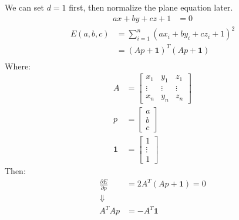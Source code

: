 \documentclass[conference,onecolumn]{IEEEtran}
\begin{document}
\begin{enumerate}[label=\arabic{enumi}.]
\begin{enumerate}
                        We can set $d = 1$ first, then normalize the plane equation later.
                        \begin{align*}
                              ax + by + cz + 1 & = 0
                        \end{align*}
                        \begin{align*}
                              E(a, b, c) & = \sum_{i = 1}^{n} (ax_i + by_i + cz_i + 1)^2 \\
                                         & = (Ap + \mathbf{1})^T(Ap + \mathbf{1})        \\
                        \end{align*}
                        Where:
                        \begin{align*}
                              A          & = \begin{bmatrix}
                                    x_1    & y_1    & z_1    \\
                                    \vdots & \vdots & \vdots \\
                                    x_n    & y_n    & z_n
                              \end{bmatrix} \\
                              p          & = \begin{bmatrix}
                                    a \\
                                    b \\
                                    c
                              \end{bmatrix} \\
                              \mathbf{1} & = \begin{bmatrix}
                                    1      \\
                                    \vdots \\
                                    1
                              \end{bmatrix}
                        \end{align*}
                        Then:
                        \begin{align*}
                              \frac{\partial E}{\partial p} & = 2A^T(Ap + \mathbf{1}) = 0 \\
                              \Downarrow                                                  \\
                              A^T A p                       & = - A^T \mathbf{1}

\end{align*}
\end{enumerate}
\end{enumerate}
\end{document}
